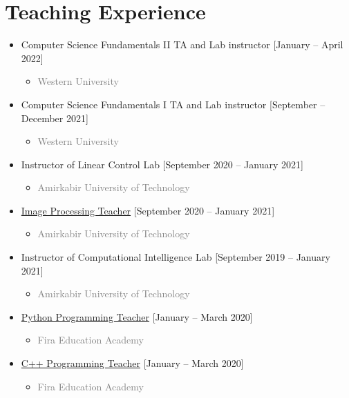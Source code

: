 \documentclass[10pt,a4paper,sans]{moderncv} %
\begin{document}
	\vspace{-0.5 em}
	
	\section{Teaching Experience}
		\begin{itemize}
		\item {} {Computer Science Fundamentals II TA and Lab instructor} \hfill [January -- April 2022]
			\begin{itemize}
				\item \textcolor{gray}{Western University}
			\end{itemize}
			
		\item {} {Computer Science Fundamentals I TA and Lab instructor} \hfill [September -- December 2021]
			\begin{itemize}
				\item \textcolor{gray}{Western University}
			\end{itemize}
			
		\item {} Instructor of Linear Control Lab \hfill [September 2020 -- January 2021]
			\begin{itemize}
				\item \textcolor{gray}{Amirkabir University of Technology}
			\end{itemize}
		\item {}\href{https://ramantech.academy/}{Image Processing Teacher} \hfill [September 2020 -- January 2021]
			\begin{itemize}
				\item \textcolor{gray}{Amirkabir University of Technology}
			\end{itemize}
			\item {} Instructor of Computational Intelligence Lab \hfill [September 2019 -- January 2021]
			\begin{itemize}
				\item \textcolor{gray}{Amirkabir University of Technology}
			\end{itemize}
					
			\item {} \href{https://ramantech.academy/}{Python Programming Teacher} \hfill [January -- March 2020]
			\begin{itemize}
				\item \textcolor{gray}{Fira Education Academy}
			\end{itemize}
			\item {} \href{https://ramantech.academy/}{C++ Programming Teacher} \hfill [January -- March 2020]
			\begin{itemize}
				\item \textcolor{gray}{Fira Education Academy}
			\end{itemize}			
			

\end{itemize}
\end{document}
